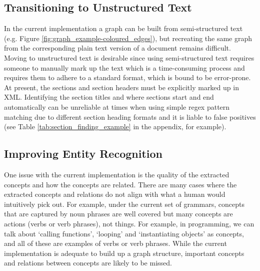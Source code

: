 \documentclass[12pt]{article}
\theoremstyle{grammarstyle}
\begin{document}
\subsection{Transitioning to Unstructured Text}
In the current implementation a graph can be built from semi-structured text (e.g. Figure \ref{fig:graph_example-coloured_edges}), but recreating the same graph from the corresponding plain text version of a document remains difficult. Moving to unstructured text is desirable since using semi-structured text requires someone to manually mark up the text which is a time-consuming process and requires them to adhere to a standard format, which is bound to be error-prone. At present, the sections and section headers must be explicitly marked up in XML. Identifying the section titles and where sections start and end automatically can be unreliable at times when using simple regex pattern matching due to different section heading formats and it is liable to false positives (see Table \ref{tab:section_finding_example} in the appendix, for example).


\subsection{Improving Entity Recognition}
One issue with the current implementation is the quality of the extracted concepts and how the concepts are related. There are many cases where the extracted concepts and relations do not align with what a human would intuitively pick out. For example, under the current set of grammars, concepts that are captured by noun phrases are well covered but many concepts are actions (verbs or verb phrases), not things. For example, in programming, we can talk about `calling functions', `looping' and `instantiating objects' as concepts, and all of these are examples of verbs or verb phrases. While the current implementation is adequate to build up a graph structure, important concepts and relations between concepts are likely to be missed.
\end{document}

